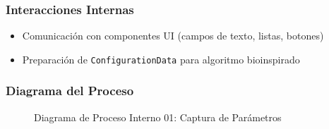 \subsubsection{Interacciones Internas}
\begin{itemize}
    \item Comunicación con componentes UI (campos de texto, listas, botones)
    \item Preparación de \texttt{ConfigurationData} para algoritmo bioinspirado
\end{itemize}
\newpage
\subsubsection{Diagrama del Proceso}
\begin{figure}[H]
    \centering
        \caption{Diagrama de Proceso Interno 01: Captura de Parámetros}%
    \label{fig:process_diagram01}
\end{figure}
\newpage